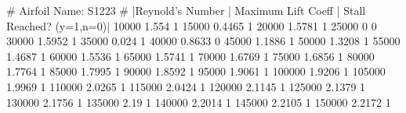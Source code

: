 # Airfoil Name: S1223
# |Reynold's Number | Maximum Lift Coeff | Stall Reached? (y=1,n=0)|
10000 1.554 1
15000 0.4465 1
20000 1.5781 1
25000 0   0
30000 1.5952 1
35000 0.024 1
40000 0.8633 0
45000 1.1886 1
50000 1.3208 1
55000 1.4687 1
60000 1.5536 1
65000 1.5741 1
70000 1.6769 1
75000 1.6856 1
80000 1.7764 1
85000 1.7995 1
90000 1.8592 1
95000 1.9061 1
100000 1.9206 1
105000 1.9969 1
110000 2.0265 1
115000 2.0424 1
120000 2.1145 1
125000 2.1379 1
130000 2.1756 1
135000 2.19 1
140000 2.2014 1
145000 2.2105 1
150000 2.2172 1
